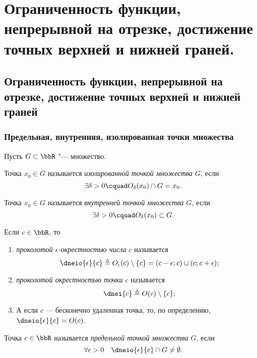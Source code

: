 \chapter{Ограниченность функции, непрерывной на отрезке, достижение точных верхней и нижней граней.}

\section{Ограниченность функции, непрерывной на отрезке, достижение точных верхней и нижней граней}

\subsection{Предельная, внутренняя, изолированная точки множества}
Пусть $G \subset \bbR$ "--- множество.
\begin{defn}
Точка $x_0 \in G$ называется \textit{изолированной точкой множества} $G$, если $$\exists \delta >0\cquad  O_\delta(x_0) \cap G = x_0.$$
\end{defn}

\begin{defn}
Точка $x_0 \in G$ называется \textit{внутренней точкой множества} $G$, если $$\exists \delta >0\cquad O_\delta(x_0) \subset G.$$
\end{defn}

\begin{defn}
Если $c \in \bbR$, то 
\begin{enumerate}[wide, labelwidth=!, labelindent=0pt, nolistsep]
\item
\textit{проколотой $\epsilon$-окрестностью числа} $c$ называется $$\dneio{\epsilon}{c} \triangleq O_\epsilon(c)\setminus\{c\}=(c-\epsilon;c)\cup(c;c+\epsilon);$$
\item
\textit{проколотой окрестностью точки} $c$ называется $$\dnei{c} \triangleq O(c)\setminus \{c\};$$
\item[\textbullet]
А если $c$ --- бесконечно удаленная точка, то, по определению, $\dneio{\epsilon}{c}= O (c) $.
\end{enumerate}
\end{defn}

\begin{defn}
Точка $c \in \bbR$ называется \textit{предельной точкой множества} $G$, если $$\forall \epsilon >0 \quad \dneio{\epsilon}{c} \cap G \ne \emptyset.$$
\end{defn}

